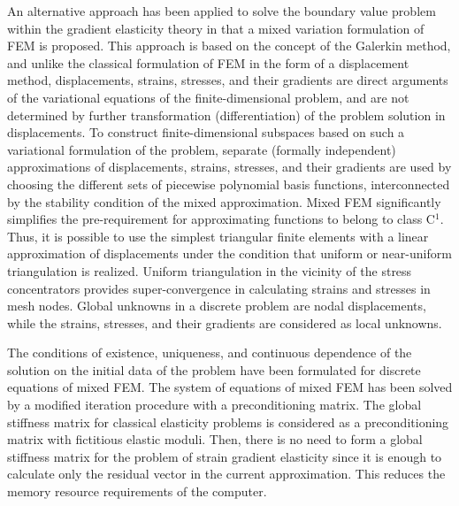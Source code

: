 An alternative approach has been applied to solve the boundary value problem within the gradient elasticity theory in that a mixed variation formulation of FEM is proposed. This approach is based on the concept of the Galerkin method, and unlike the classical formulation of FEM in the form of a displacement method, displacements, strains, stresses, and their gradients are direct arguments of the variational equations of the finite-dimensional problem, and are not determined by further transformation (differentiation) of the problem solution in displacements. To construct finite-dimensional subspaces based on such a variational formulation of the problem, separate (formally independent) approximations of displacements, strains, stresses, and their gradients are used by choosing the different sets of piecewise polynomial basis functions, interconnected by the stability condition of the mixed approximation. Mixed FEM significantly simplifies the pre-requirement for approximating functions to belong to class C${}^{1}$. Thus, it is possible to use the simplest triangular finite elements with a linear approximation of displacements under the condition that uniform or near-uniform triangulation is realized. Uniform triangulation in the vicinity of the stress concentrators provides super-convergence in calculating strains and stresses in mesh nodes. Global unknowns in a discrete problem are nodal displacements, while the strains, stresses, and their gradients are considered as local unknowns.

The conditions of existence, uniqueness, and continuous dependence of the solution on the initial data of the problem have been formulated for discrete equations of mixed FEM. The system of equations of mixed FEM has been solved by a modified iteration procedure with a preconditioning matrix. The global stiffness matrix for classical elasticity problems is considered as a preconditioning matrix with fictitious elastic moduli. Then, there is no need to form a global stiffness matrix for the problem of strain gradient elasticity since it is enough to calculate only the residual vector in the current approximation. This reduces the memory resource requirements of the computer.

